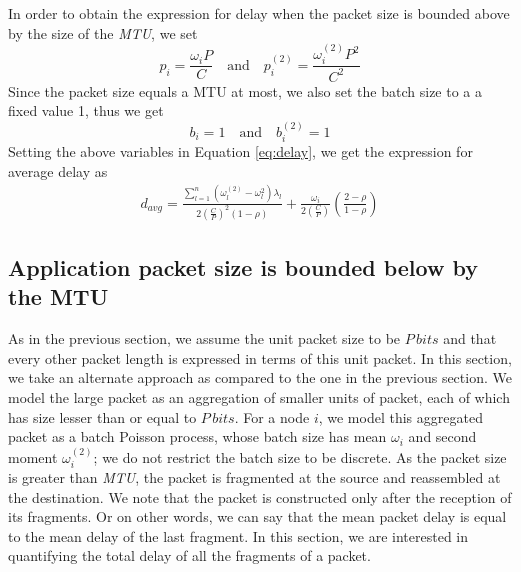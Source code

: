 \documentclass[10pt, conference, compsocconf]{IEEEtran}
\begin{document}
In order to obtain the expression for delay when the packet size is bounded above by the size of the \textit{MTU}, we set 
$$ p_i = \frac{\omega_iP}{C}	\quad \textrm{and} \quad p^{(2)}_i = \frac{\omega^{(2)}_iP^2}{C^2} $$ 
Since the packet size equals a MTU at most, we also set the batch size to a a fixed value 1, thus we get
$$ b_i = 1	\quad \textrm{and} \quad b^{(2)}_i = 1 $$  
Setting the above variables in Equation \eqref{eq:delay}, we get the expression for average delay as
\begin{eqnarray} \label{eq:delay1}
d_{avg} =  \frac{\sum^n_{l=1} (\omega^{(2)}_l - \omega^2_l) \lambda_l}{2 \left( \frac{C}{P} \right) ^2(1-\rho)} + \frac{\omega_i}{2\left( \frac{C}{P} \right)}\left(\frac{2-\rho}{1-\rho} \right)
\end{eqnarray}

\subsection{Application packet size is bounded below by the MTU}
As in the previous section, we assume the unit packet size to be $P\, bits$ and that every other packet length is expressed in terms of this unit packet. In this section, we take an alternate approach as compared to the one in the previous section. We model the large packet as an aggregation of smaller units of packet, each of which has size lesser than or equal to $P\, bits$. For a node $i$, we model this aggregated packet as a batch Poisson process, whose batch size has mean $\omega_i$ and second moment $\omega^{(2)}_i$; we do not restrict the batch size to be discrete. As the packet size is greater than \textit{MTU}, the packet is fragmented at the source and reassembled at the destination. We note that the packet is constructed only after the reception of its fragments. Or on other words, we can say that the mean packet delay is equal to the mean delay of the last fragment. In this section, we are interested in quantifying the total delay of all the fragments of a packet. 
\end{document}
